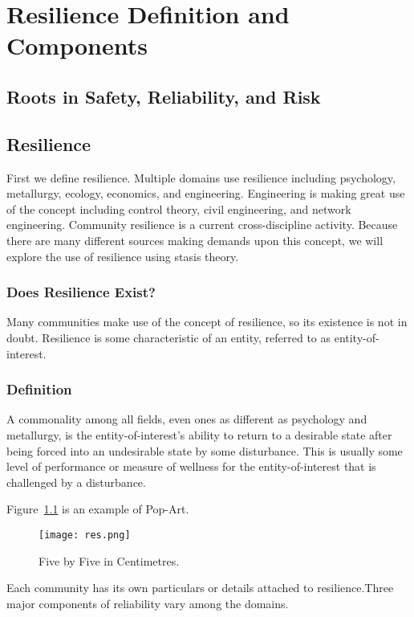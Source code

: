 
\renewcommand{\thechapter}{2}

\chapter{Resilience Definition and Components}

\section{Roots in Safety, Reliability, and Risk}

\section{Resilience}
First we define resilience. Multiple domains use resilience including
psychology, metallurgy, ecology, economics, and
engineering. Engineering is making great use of the concept including
control theory, civil engineering, and network engineering. Community
resilience is a current cross-discipline activity. Because there are
many different sources making demands upon this concept, we will
explore the use of resilience using stasis theory.

\subsection{Does Resilience Exist?}

Many communities make use of the concept of resilience, so its
existence is not in doubt. Resilience is some characteristic of an
entity, referred to as entity-of-interest. 

\subsection{Definition}

A commonality among all fields, even ones as different as
psychology and metallurgy, is the entity-of-interest's ability to
return to a desirable state after being forced into an undesirable
state by some disturbance. This is usually some level of performance
or measure of wellness for the entity-of-interest that is challenged
by a disturbance.

Figure~\ref{res} is an example of Pop-Art.
\begin{figure}
  \centering
  \texttt{[image: res.png]}
  \caption{Five by Five in Centimetres.\label{res}}
\end{figure}
Each community has its own particulars or details attached to
resilience.Three major components of reliability vary among the domains. 

